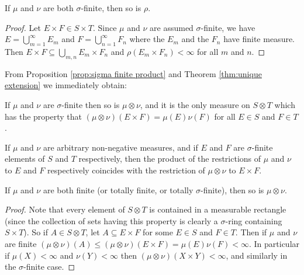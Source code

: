 \begin{proposition}
\label{prop:sigma finite product}
If $\mu$ and $\nu$ are both $\sigma$-finite, then so is $\rho$.
\end{proposition}

\begin{proof}
Let $E\times F\in S\times T$. Since $\mu$ and $\nu$ are assumed $\sigma$-finite, we have $E=\bigcup_{m=1}^\infty E_m$ and $F=\bigcup_{n=1}^\infty F_n$ where the $E_m$ and the $F_n$ have finite measure. Then $E\times F\subseteq\bigcup_{m,n}E_m\times F_n$ and $\rho(E_m\times F_n)<\infty$ for all $m$ and $n$.
\end{proof}

From Proposition \ref{prop:sigma finite product} and Theorem \ref{thm:unique extension} we immediately obtain:

\begin{proposition}
If $\mu$ and $\nu$ are $\sigma$-finite then so is $\mu\otimes\nu$, and it is the only measure on $S\otimes T$ which has the property that $(\mu\otimes\nu)(E\times F)=\mu(E)\nu(F)$ for all $E\in S$ and $F\in T$.
\end{proposition}

\begin{corollary}
If $\mu$ and $\nu$ are arbitrary non-negative measures, and if $E$ and $F$ are $\sigma$-finite elements of $S$ and $T$ respectively, then the product of the restrictions of $\mu$ and $\nu$ to $E$ and $F$ respectively coincides with the restriction of $\mu\otimes\nu$ to $E\times F$.
\end{corollary} 

\begin{proposition}
\label{prop:totally finite product}
If $\mu$ and $\nu$ are both finite (or totally finite, or totally $\sigma$-finite), then so is $\mu\otimes\nu$.
\end{proposition}

\begin{proof}
Note that every element of $S\otimes T$ is contained in a measurable rectangle (since the collection of sets having this property is clearly a $\sigma$-ring containing $S\times T$). So if $A\in S\otimes T$, let $A\subseteq E\times F$ for some $E\in S$ and $F\in T$. Then if $\mu$ and $\nu$ are finite $(\mu\otimes\nu)(A)\leq(\mu\otimes\nu)(E\times F)=\mu(E)\nu(F)<\infty$. In particular if $\mu(X)<\infty$ and $\nu(Y)<\infty$ then $(\mu\otimes\nu)(X\times Y)<\infty$, and similarly in the $\sigma$-finite case.
\end{proof}

